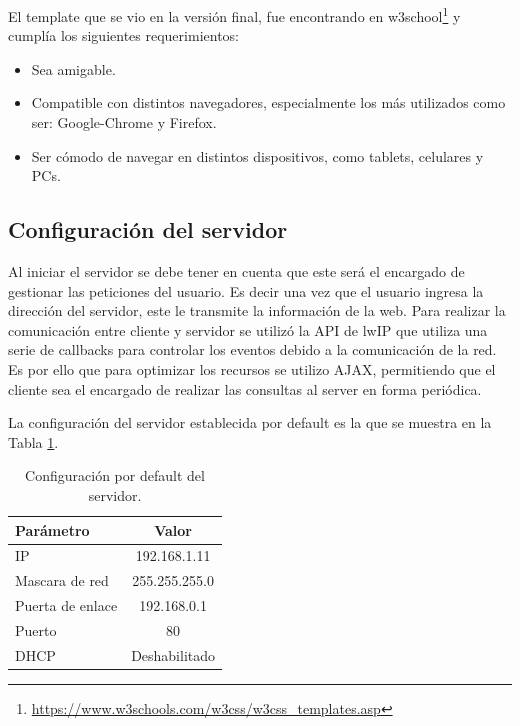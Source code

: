 El template que se vio en la versión final, fue encontrando en w3school\footnote{\url{https://www.w3schools.com/w3css/w3css_templates.asp}} y cumplía los siguientes requerimientos:
\begin{itemize}
  \item Sea amigable.
  \item Compatible con distintos navegadores, especialmente los más utilizados como ser: Google-Chrome y Firefox. 
  \item Ser cómodo de navegar en distintos dispositivos, como tablets, celulares y PCs.
\end{itemize}


\subsection{Configuración del servidor}
Al iniciar el servidor se debe tener en cuenta que este será el encargado de gestionar las peticiones del usuario. 
Es decir una vez que el usuario ingresa la dirección del servidor, este le transmite la información de la web.
Para realizar la comunicación entre cliente y servidor se utilizó la API de lwIP \citep{webserver}  que utiliza una serie de callbacks para controlar los eventos debido a la comunicación de la red. Es por ello que para optimizar los recursos se utilizo AJAX, permitiendo que el cliente sea el encargado de realizar las consultas al server en forma periódica.

La configuración del servidor establecida por default es la que se muestra en la Tabla \ref{tab:servercfg}.
\begin{table}[!h]
  \centering
  \begin{tabular}{l c}
    \hline 
    Parámetro    & Valor \\
    \hline \hline
    IP               & 192.168.1.11 \\
    Mascara de red   & 255.255.255.0 \\
    Puerta de enlace & 192.168.0.1 \\
    Puerto           & 80 \\
    DHCP             & Deshabilitado \\
    \hline
  \end{tabular}
  \caption{Configuración por default del servidor.}
  \label{tab:servercfg}
\end{table}


